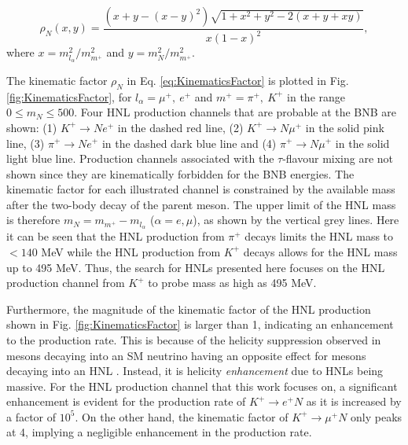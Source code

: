 \begin{equation}
	\rho_{N}(x,y) = \frac{(x+y-(x-y)^{2})\sqrt{1+x^{2}+y^{2}-2(x+y+xy)}}{x(1-x)^{2}},
\label{eq:KinematicsFactor}
\end{equation}
where $x = m^{2}_{l_{\alpha}}/m^{2}_{m^+}$ and $y=m^{2}_{N}/m^{2}_{m^+}$.

The kinematic factor $\rho_N$ in Eq. \ref{eq:KinematicsFactor} is plotted in Fig. \ref{fig:KinematicsFactor}, for $l_{\alpha} = \mu^+,\ e^+$ and $m^+ = \pi^+,\ K^+$ in the range $0 \leq m_N \leq 500$.
Four HNL production channels that are probable at the BNB are shown: (1) $K^+ \rightarrow Ne^+$ in the dashed red line, (2) $K^+ \rightarrow N\mu^+$ in the solid pink line, (3) $\pi^+ \rightarrow Ne^
+$ in the dashed dark blue line and (4) $\pi^+ \rightarrow N\mu^+$ in the solid light blue line.  
Production channels associated with the $\tau$-flavour mixing are not shown since they are kinematically forbidden for the BNB energies.
The kinematic factor for each illustrated channel is constrained by the available mass after the two-body decay of the parent meson.
The upper limit of the HNL mass is therefore $m_{N} = m_{m^+} - m_{l_{\alpha}}$ ($\alpha=e,\mu$), as shown by the vertical grey lines.
Here it can be seen that the HNL production from $\pi^+$ decays limits the HNL mass to $< 140$ MeV while the HNL production from $K^+$ decays allows for the HNL mass up to 495 MeV. 
Thus, the search for HNLs presented here focuses on the HNL production channel from $K^+$ to probe mass as high as 495 MeV.



Furthermore, the magnitude of the kinematic factor of the HNL production shown in Fig. \ref{fig:KinematicsFactor} is larger than 1, indicating an enhancement to the production rate.
This is because of the helicity suppression observed in mesons decaying into an SM neutrino having an opposite effect for mesons decaying into an HNL \cite{HNLKelly}.
Instead, it is helicity \textit{enhancement} due to HNLs being massive.
For the HNL production channel that this work focuses on, a significant enhancement is evident for the production rate of $K^+\rightarrow e^+ N$ as it is increased by a factor of $10^{5}$.
On the other hand, the kinematic factor of $K^+ \rightarrow \mu^+ N$ only peaks at 4, implying a negligible enhancement in the production rate.

